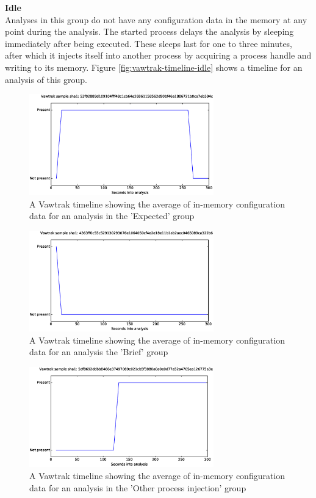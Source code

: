 \documentclass[conference]{IEEEtran}
\begin{document}
\textbf{Idle}
\\Analyses in this group do not have any \Gls{configuration data} in the memory at any point during the analysis. The started process delays the analysis by \Gls{sleeping} immediately after  being executed. These sleeps last for one to three minutes, after which it injects itself into another process by acquiring a process handle and writing to its memory. Figure \ref{fig:vawtrak-timeline-idle} shows a timeline for an analysis of this group.
\newpage

\begin{figure}[h]
    \includegraphics[width=8cm,scale=0.5]{images/vawtrak/vawtrak-timelines-eps/Vawtrak-53f02888d109104fff48c1cb64e26961158562d90bf46a1886721b0ca7eb594c.eps}
    \caption{A Vawtrak timeline showing the average of in-memory configuration data for an analysis in the 'Expected' group}
    \label{fig:vawtrak-timeline-normal}
\end{figure}
\begin{figure}[h]
    \includegraphics[width=8cm,scale=0.5]{images/vawtrak/vawtrak-timelines-eps/Vawtrak-4363ff0c55c529130293076e1064050cf4e2e18e11b1ab2aec0465089ca322b6.eps}
    \caption{A Vawtrak timeline showing the average of in-memory configuration data for an analysis the 'Brief' group}
    \label{fig:vawtrak-timeline-brief}
\end{figure}
\begin{figure}[!h]
    \includegraphics[width=8cm,scale=0.5]{images/vawtrak/vawtrak-timelines-eps/Vawtrak-5df8692ddbb8466e37497089c021cb5f3880a0a0e0d77a52a4705ea126775a3e.eps}
    \caption{A Vawtrak timeline showing the average of in-memory configuration data for an analysis in the 'Other process injection' group}
    \label{fig:vawtrak-timeline-injection}
\end{figure}
\end{document}
